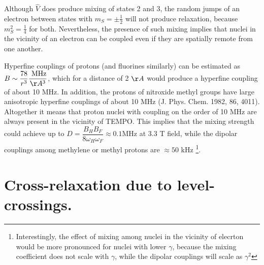 \documentclass[a4paper, 12pt]{article}
\begin{document}
Although $\hat{V}$ does produce mixing of states 2 and 3, the random jumps of an electron between states with $m_S = \pm \frac{1}{2}$ will not produce relaxation, because $m_S^2 = \frac{1}{4}$ for both. Nevertheless, the presence of such mixing implies that nuclei in the vicinity of an electron can be coupled even if they are spatially remote from one another. 

Hyperfine couplings of protons (and fluorines similarly) can be estimated as $B \sim \dfrac{78}{r^3} \dfrac{\text{ MHz} }{ \AA^3}  $, which for a distance of 2 $\AA$ would produce  a hyperfine coupling of about 10 MHz. In addition, the protons of nitroxide methyl groups have large anisotropic hyperfine couplings of about 10 MHz (J. Phys. Chem. 1982, 86, 4011). Altogether it means that proton nuclei with coupling on the order of  10 MHz are always present in the vicinity of TEMPO. This implies that the mixing strength could achieve up to $D = \dfrac{B_H B_F}{8 \omega_H \omega_F} \approx 0.1$MHz at $3.3$ T field, while the dipolar couplings among methylene or methyl protons are $\approx 50$ kHz \footnote{Interestingly, the effect of mixing among nuclei in the vicinity of elecrton would be more pronounced for nuclei with lower $\gamma$, because the mixing coefficient does not scale with $\gamma$, while the dipolar couplings will scale as $\gamma^2$}.

\section{Cross-relaxation due to level-crossings.}
\end{document}
